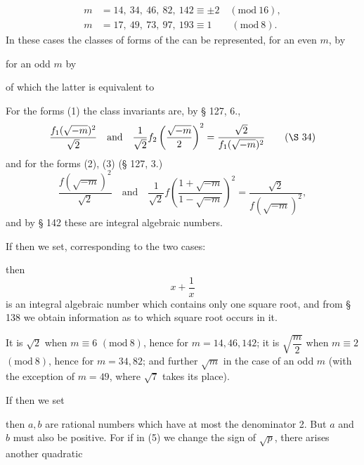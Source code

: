 \[
\begin{aligned}
m &= 14,\ 34,\ 46,\ 82,\ 142 \equiv \pm2 \quad (\mathrm{mod}\ 16),\\
m &= 17,\ 49,\ 73,\ 97,\ 193 \equiv 1 \qquad (\mathrm{mod}\ 8).
\end{aligned}
\]
In these cases the classes of forms of the  can be represented, for an even $m$, by


for an odd $m$ by


of which the latter is equivalent to


For the forms (1) the class invariants are, by § 127, 6.,
\[
\frac{f_1(\sqrt{-m})^2}{\sqrt2} \quad \text{and} \quad \frac{1}{\sqrt2} f_2\left(\frac{\sqrt{-m}}{2}\right)^2 = \frac{\sqrt2}{f_1(\sqrt{-m})^2} \qquad (\S\ 34)
\]
and for the forms (2), (3) (§ 127, 3.)
\[
\frac{f(\sqrt{-m})^2}{\sqrt2} \quad \text{and} \quad \frac{1}{\sqrt2} f\left(\frac{1+\sqrt{-m}}{1-\sqrt{-m}}\right)^2 = \frac{\sqrt2}{f(\sqrt{-m})^2},
\]
and by § 142 these are integral algebraic numbers.

If then we set, corresponding to the two cases:


then
\[
x + \frac{1}{x}
\]
is an integral algebraic number which contains only one square root, and from § 138 we obtain information as to which square root occurs in it.

It is $\sqrt2$ when $m \equiv 6$ $(\mathrm{mod}\ 8)$, hence for $m = 14, 46, 142$; it is $\sqrt{\dfrac{m}{2}}$ when $m \equiv 2$ $(\mathrm{mod}\ 8)$, hence for $m = 34, 82$; and further $\sqrt m$ in the case of an odd $m$ (with the exception of $m = 49$, where $\sqrt7$ takes its place).

If then we set


then $a, b$ are rational numbers which have at most the denominator 2. But $a$ and $b$ must also be positive. For if in (5) we change the sign of $\sqrt p$, there arises another quadratic
